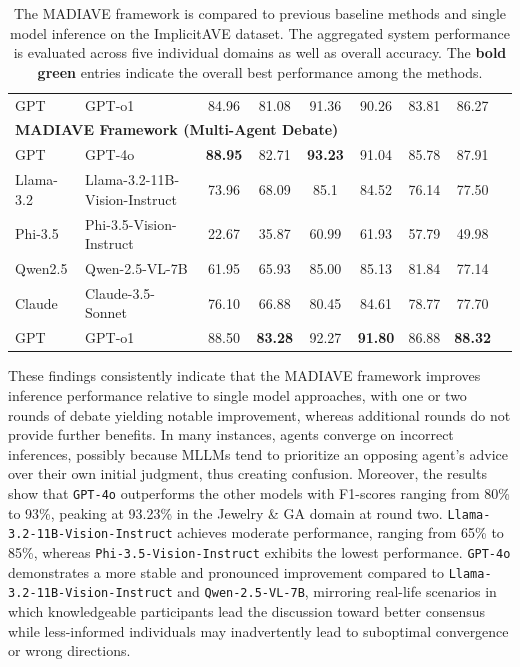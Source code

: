 \documentclass[11pt]{article}
\newcommand{\modelname}{MADIAVE}
\newcommand{\llamaname}{Llama-3.2-11B-Vision-Instruct}
\newcommand{\Qwenname}{Qwen-2.5-VL-7B}
\newcommand{\phiname}{Phi-3.5-Vision-Instruct}
\begin{document}
\begin{table}[ht]
\begin{tabularx}{370pt}{l l c c c c c c c}
    GPT & GPT-o1 & 84.96 & 81.08 & 91.36 & 90.26 & 83.81 & 86.27 \\ %
    \multicolumn{8}{l}{\textbf{\textsc{\modelname} Framework (Multi-Agent Debate)}} \\
    GPT & GPT-4o & \textbf{\textcolor{dgreen}{88.95}} & 82.71 & \textbf{\textcolor{dgreen}{93.23}} & 91.04 & 85.78 & 87.91 \\
    Llama-3.2 & \llamaname & 73.96 & 68.09 & 85.1 & 84.52 & 76.14 & 77.50 \\
    Phi-3.5 & \phiname & 22.67 & 35.87 & 60.99 & 61.93 & 57.79 & 49.98 \\
    Qwen2.5 & \Qwenname & 61.95 & 65.93 & 85.00 & 85.13 & 81.84 & 77.14 \\
    Claude & Claude-3.5-Sonnet & 76.10 & 66.88 & 80.45 & 84.61 & 78.77 & 77.70 \\ %
    GPT & GPT-o1 & 88.50 & \textbf{\textcolor{dgreen}{83.28}} & 92.27 & \textbf{\textcolor{dgreen}{91.80}} & 86.88 & \textbf{\textcolor{dgreen}{88.32}} \\ %
    \hline
  \end{tabularx}
  \caption{\label{tab:baseline comparison}
    The \textsc{\modelname} framework is compared to previous baseline methods and single model inference on the ImplicitAVE dataset. The aggregated system performance is evaluated across five individual domains as well as overall accuracy. The \textbf{\textcolor{dgreen}{bold green}} entries indicate the overall best performance among the methods.}
  \vspace{-1mm}
\end{table}


These findings consistently indicate that the \textsc{\modelname} framework improves inference performance relative to single model approaches, with one or two rounds of debate yielding notable improvement, whereas additional rounds do not provide further benefits. In many instances, agents converge on incorrect inferences, possibly because MLLMs tend to prioritize an opposing agent’s advice over their own initial judgment, thus creating confusion. Moreover, the results show that \texttt{GPT-4o} outperforms the other models with F1-scores ranging from 80\% to 93\%, peaking at 93.23\% in the Jewelry \& GA domain at round two. \texttt{\llamaname} achieves moderate performance, ranging from 65\% to 85\%, whereas \texttt{\phiname} exhibits the lowest performance. \texttt{GPT-4o} demonstrates a more stable and pronounced improvement compared to \texttt{\llamaname} and \texttt{\Qwenname}, mirroring real-life scenarios in which knowledgeable participants lead the discussion toward better consensus while less-informed individuals may inadvertently lead to suboptimal convergence or wrong directions.
\end{document}
